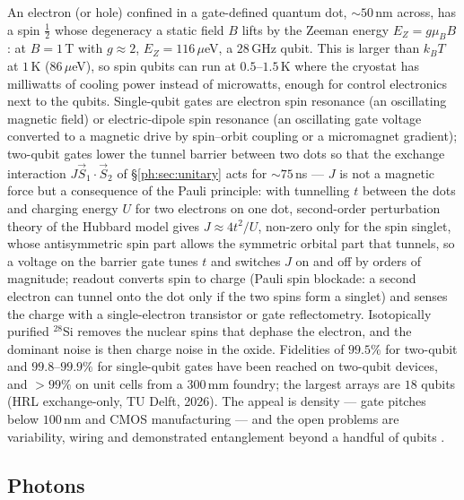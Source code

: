 An electron (or hole) confined in a gate-defined quantum dot, $\sim50$\,nm across, has a spin
$\tfrac12$ whose degeneracy a static field $B$ lifts by the Zeeman energy
$E_Z=g\mu_BB$: at $B=1$\,T with $g\approx2$, $E_Z=116\,\mu$eV, a $28$\,GHz qubit. This is
larger than $k_BT$ at $1$\,K ($86\,\mu$eV), so spin qubits can run at $0.5$--$1.5$\,K where the
cryostat has milliwatts of cooling power instead of microwatts, enough for control electronics next
to the qubits. Single-qubit gates are electron spin resonance (an oscillating magnetic field) or
electric-dipole spin resonance (an oscillating gate voltage converted to a magnetic drive by
spin--orbit coupling or a micromagnet gradient); two-qubit gates lower the tunnel barrier between
two dots so that the exchange interaction $J\vec S_1\cdot\vec S_2$ of \S\ref{ph:sec:unitary} acts
for $\sim75$\,ns --- $J$ is not a magnetic force but a consequence of the Pauli principle: with
tunnelling $t$ between the dots and charging energy $U$ for two electrons on one dot, second-order
perturbation theory of the Hubbard model gives $J\approx4t^2/U$, non-zero only for the spin
singlet, whose antisymmetric spin part allows the symmetric orbital part that tunnels, so a
voltage on the barrier gate tunes $t$ and switches $J$ on and off by orders of magnitude; readout converts spin to charge (Pauli spin blockade: a second electron can
tunnel onto the dot only if the two spins form a singlet) and senses the charge with a
single-electron transistor or gate reflectometry. Isotopically purified $^{28}$Si removes the
nuclear spins that dephase the electron, and the dominant noise is then charge noise in the oxide.
Fidelities of $99.5\%$ for two-qubit and $99.8$--$99.9\%$ for single-qubit gates have been reached
on two-qubit devices, and $>99\%$ on unit cells from a $300$\,mm foundry; the largest arrays are
$18$ qubits (HRL exchange-only, TU Delft, 2026). The appeal is density --- gate pitches below
$100$\,nm and CMOS manufacturing --- and the open problems are variability, wiring and
demonstrated entanglement beyond a handful of qubits \cite{ph:uqt26}.

\subsection{Photons}\label{ph:sec:photons}

